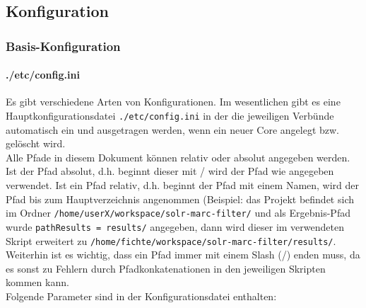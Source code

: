 \documentclass[10pt]{article}
\begin{document}
\subsection{Konfiguration}
\subsubsection{Basis-Konfiguration}
\paragraph{./etc/config.ini}
\label{sec:para:config.ini}
Es gibt verschiedene Arten von Konfigurationen. Im wesentlichen gibt es eine Hauptkonfigurationsdatei \texttt{./etc/config.ini} in der die jeweiligen Verbünde automatisch ein und ausgetragen werden, wenn ein neuer Core angelegt bzw. gelöscht wird. \\
Alle Pfade in diesem Dokument können relativ oder absolut angegeben werden. Ist der Pfad absolut, d.h. beginnt dieser mit / wird der Pfad wie angegeben verwendet. Ist ein Pfad relativ, d.h. beginnt der Pfad mit einem Namen, wird der Pfad bis zum Hauptverzeichnis angenommen (Beispiel: das Projekt befindet sich im Ordner \texttt{/home/userX/workspace/solr-marc-filter/} und als Ergebnis-Pfad wurde \texttt{pathResults = results/} angegeben, dann wird dieser im verwendeten Skript erweitert zu \texttt{/home/fichte/workspace/solr-marc-filter/results/}. \\
Weiterhin ist es wichtig, dass ein Pfad immer mit einem Slash (/) enden muss, da es sonst zu Fehlern durch Pfadkonkatenationen in den jeweiligen Skripten kommen kann. \\
Folgende Parameter sind in der Konfigurationsdatei enthalten:
\end{document}
